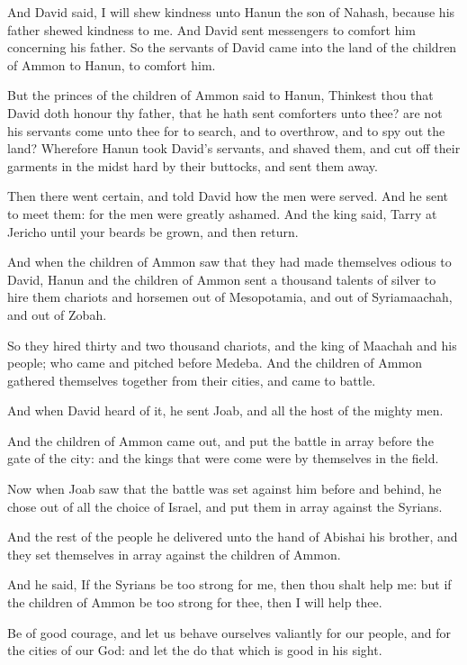 \verse And David said, I will shew kindness unto Hanun the son of Nahash, because his father shewed kindness to me. And David sent messengers to comfort him concerning his father. So the servants of David came into the land of the children of Ammon to Hanun, to comfort him.

\verse But the princes of the children of Ammon said to Hanun, Thinkest thou that David doth honour thy father, that he hath sent comforters unto thee?  are not his servants come unto thee for to search, and to overthrow, and to spy out the land?  \verse Wherefore Hanun took David's servants, and shaved them, and cut off their garments in the midst hard by their buttocks, and sent them away.

\verse Then there went certain, and told David how the men were served.  And he sent to meet them: for the men were greatly ashamed. And the king said, Tarry at Jericho until your beards be grown, and then return.

\verse And when the children of Ammon saw that they had made themselves odious to David, Hanun and the children of Ammon sent a thousand talents of silver to hire them chariots and horsemen out of Mesopotamia, and out of Syriamaachah, and out of Zobah.

\verse So they hired thirty and two thousand chariots, and the king of Maachah and his people; who came and pitched before Medeba. And the children of Ammon gathered themselves together from their cities, and came to battle.

\verse And when David heard of it, he sent Joab, and all the host of the mighty men.

\verse And the children of Ammon came out, and put the battle in array before the gate of the city: and the kings that were come were by themselves in the field.

\verse Now when Joab saw that the battle was set against him before and behind, he chose out of all the choice of Israel, and put them in array against the Syrians.

\verse And the rest of the people he delivered unto the hand of Abishai his brother, and they set themselves in array against the children of Ammon.

\verse And he said, If the Syrians be too strong for me, then thou shalt help me: but if the children of Ammon be too strong for thee, then I will help thee.

\verse Be of good courage, and let us behave ourselves valiantly for our people, and for the cities of our God: and let the \LORD do that which is good in his sight.


